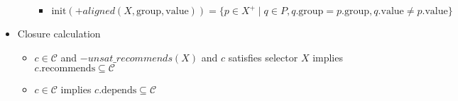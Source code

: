 \documentclass[a4paper,english]{article}
\begin{document}
\begin{itemize}
\begin{itemize}
\begin{itemize}
          \item $\mathrm{init}({+}\mathit{aligned}(X,\mathrm{group},\mathrm{value}))=\{p\in X^{+}\mid q\in P, q.\mathrm{group} = p.\mathrm{group}, q.\mathrm{value} \neq p.\mathrm{value}\}$
        \end{itemize}
    \end{itemize}
  \item Closure calculation
    \begin{itemize}
      \item $c\in \mathcal{C}$ and ${-}\mathit{unsat\_recommends}(X)$ and $c$ satisfies selector $X$ implies $c.\mathrm{recommends}\subseteq\mathcal{C}$
      \item $c\in \mathcal{C}$ implies $c.\mathrm{depends}\subseteq\mathcal{C}$
    \end{itemize}
\end{itemize}
\end{document}

